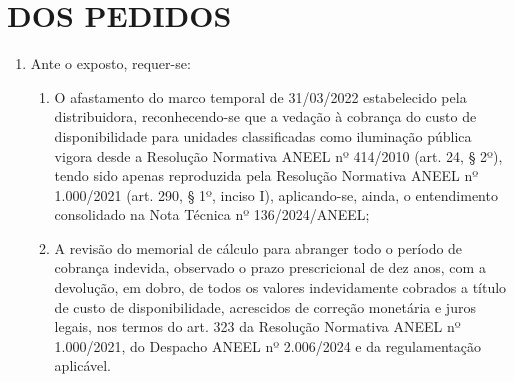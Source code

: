 \section{DOS PEDIDOS}

\begin{enumerate}[resume]
\item Ante o exposto, requer-se:
    \begin{enumerate}
        \item O afastamento do marco temporal de 31/03/2022 estabelecido pela distribuidora, reconhecendo-se que a vedação à cobrança do custo de disponibilidade para unidades classificadas como iluminação pública vigora desde a Resolução Normativa ANEEL nº 414/2010 (art. 24, § 2º), tendo sido apenas reproduzida pela Resolução Normativa ANEEL nº 1.000/2021 (art. 290, § 1º, inciso I), aplicando-se, ainda, o entendimento consolidado na Nota Técnica nº 136/2024/ANEEL;

        \item A revisão do memorial de cálculo para abranger todo o período de cobrança indevida, observado o prazo prescricional de dez anos, com a devolução, em dobro, de todos os valores indevidamente cobrados a título de custo de disponibilidade, acrescidos de correção monetária e juros legais, nos termos do art. 323 da Resolução Normativa ANEEL nº 1.000/2021, do Despacho ANEEL nº 2.006/2024 e da regulamentação aplicável.
    \end{enumerate}
\end{enumerate}